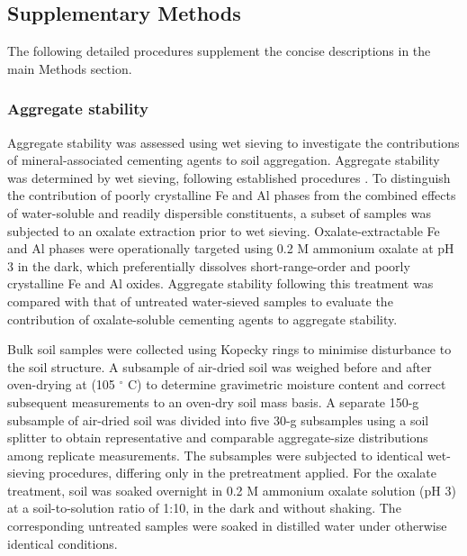 \documentclass[preprint,12pt]{elsarticle}
\begin{document}
\setcounter{figure}{0}
\setcounter{table}{0}
\setcounter{equation}{0}

\renewcommand{\thesection}{S\arabic{section}}
\renewcommand{\thefigure}{S\arabic{figure}}
\renewcommand{\thetable}{S\arabic{table}}
\renewcommand{\theequation}{S\arabic{equation}}



\subsection{Supplementary Methods}
\label{sec:si_methods}

The following detailed procedures supplement the concise descriptions in the main Methods section.

\subsubsection{Aggregate stability}

Aggregate stability was assessed using wet sieving to investigate the contributions of mineral-associated cementing agents to soil aggregation. Aggregate stability was determined by wet sieving, following established procedures \citep{KemperRosenau2018}. To distinguish the contribution of poorly crystalline Fe and Al phases from the combined effects of water-soluble and readily dispersible constituents, a subset of samples was subjected to an oxalate extraction prior to wet sieving. Oxalate-extractable Fe and Al phases were operationally targeted using 0.2 M ammonium oxalate at pH 3 in the dark, which preferentially dissolves short-range-order and poorly crystalline Fe and Al oxides. Aggregate stability following this treatment was compared with that of untreated water-sieved samples to evaluate the contribution of oxalate-soluble cementing agents to aggregate stability.

Bulk soil samples were collected using Kopecky rings to minimise disturbance to the soil structure. A subsample of air-dried soil was weighed before and after oven-drying at (105 $^\circ$ C) to determine gravimetric moisture content and correct subsequent measurements to an oven-dry soil mass basis. A separate 150-g subsample of air-dried soil was divided into five 30-g subsamples using a soil splitter to obtain representative and comparable aggregate-size distributions among replicate measurements. The subsamples were subjected to identical wet-sieving procedures, differing only in the pretreatment applied. For the oxalate treatment, soil was soaked overnight in 0.2 M ammonium oxalate solution (pH 3) at a soil-to-solution ratio of 1:10, in the dark and without shaking. The corresponding untreated samples were soaked in distilled water under otherwise identical conditions.
\end{document}
